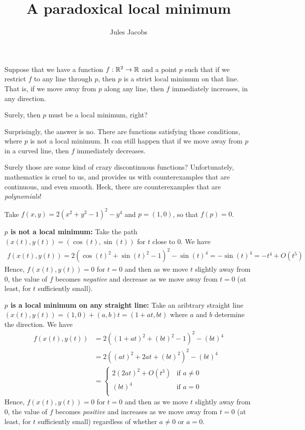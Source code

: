 

\newcommand{\tac}[1]{\lstinline[mathescape]~#1~}
\newcommand{\ciff}{\ \leftrightarrow\ }
\newcommand{\hyp}{\tac{H}}
\newcommand{\hypB}{\tac{G}}
\newcommand{\var}{\tac{x}}
\newcommand{\varB}{\tac{y}}

\newtheorem*{nlemma}{Lemma}


\title{A paradoxical local minimum}
\author{Jules Jacobs}


\maketitle
Suppose that we have a function $f : \mathbb{R}^2 \to \mathbb{R}$ and a point $p$ such that if we restrict $f$ to any line through $p$, then $p$ is a strict local minimum on that line.
That is, if we move away from $p$ along any line, then $f$ immediately increases, in any direction.

Surely, then $p$ must be a local minimum, right?

Surprisingly, the answer is no. There are functions satisfying those conditions, where $p$ is not a local minimum.
It can still happen that if we move away from $p$ in a curved line, then $f$ immediately decreases.

Surely those are some kind of crazy discontinuous functions?
Unfortunately, mathematics is cruel to us, and provides us with counterexamples that are continuous, and even smooth. Heck, there are counterexamples that are \emph{polynomials}!

Take $f(x,y) = 2(x^2 + y^2 - 1)^2 - y^4$ and $p = (1,0)$, so that $f(p) = 0$.

\textbf{$p$ is not a local minimum:}
Take the path $(x(t),y(t)) = (\cos(t),\sin(t))$ for $t$ close to $0$. We have
\begin{align*}
  f(x(t),y(t)) = 2(\cos(t)^2 + \sin(t)^2 - 1)^2 - \sin(t)^4 = -\sin(t)^4 = -t^4 + O(t^5)
\end{align*}
Hence, $f(x(t),y(t)) = 0$ for $t = 0$ and then as we move $t$ slightly away from $0$, the value of $f$ becomes \emph{negative} and decrease as we move away from $t=0$ (at least, for $t$ sufficiently small).

\textbf{$p$ is a local minimum on any straight line:}
Take an aribtrary straight line $(x(t),y(t)) = (1,0) + (a,b)t = (1 + at, bt)$ where $a$ and $b$ determine the direction. We have
\begin{align*}
  f(x(t),y(t))
    &= 2((1 + at)^2 + (bt)^2 - 1)^2 - (bt)^4 \\
    &= 2((at)^2 + 2at + (bt)^2)^2 - (bt)^4 \\
    &= \begin{cases}
      2(2at)^2 + O(t^3) & \text{if $a \neq 0$} \\
      (bt)^4 & \text{if $a = 0$} \\
    \end{cases}
\end{align*}
Hence, $f(x(t),y(t)) = 0$ for $t = 0$ and then as we move $t$ slightly away from $0$, the value of $f$ becomes \emph{positive} and increases as we move away from $t=0$ (at least, for $t$ sufficiently small) regardless of whether $a \neq 0$ or $a = 0$.

